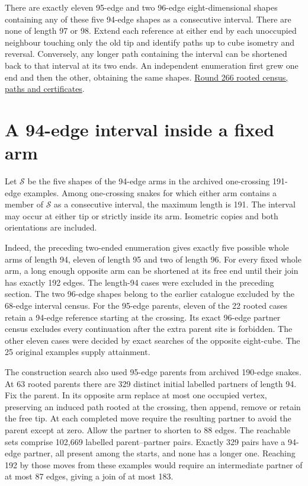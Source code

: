 \documentclass[11pt,a4paper]{article}
\theoremstyle{definition}
\theoremstyle{remark}
\begin{document}
There are exactly eleven 95-edge and two 96-edge eight-dimensional shapes
containing any of these five 94-edge shapes as a consecutive interval.
There are none of length 97 or 98. Extend each reference at either
end by each unoccupied neighbour touching only the old tip and identify
paths up to cube isometry and reversal. Conversely, any longer path
containing the interval can be shortened back to that interval at its
two ends. An independent enumeration first grew one end and then the
other, obtaining the same shapes.
\href{https://github.com/hironaka-iori/Snake-in-the-box-in-9/tree/main/milestones/266-rebuilding-one-arm}{Round 266 rooted census, paths and certificates}.

\section{A 94-edge interval inside a fixed arm}
Let $\mathcal S$ be the five shapes of the 94-edge arms in the archived
one-crossing 191-edge examples. Among one-crossing snakes for which either
arm contains a member of $\mathcal S$ as a consecutive interval, the
maximum length is 191. The interval may occur at either tip or strictly
inside its arm. Isometric copies and both orientations are included.

Indeed, the preceding two-ended enumeration gives exactly five possible
whole arms of length 94, eleven of length 95 and two of length 96.
For every fixed whole arm, a long enough opposite arm can be shortened at
its free end until their join has exactly 192 edges. The length-94 cases
were excluded in the preceding section. The two 96-edge shapes belong
to the earlier catalogue excluded by the 68-edge interval census.
For the 95-edge parents, eleven of the 22 rooted cases retain a 94-edge
reference starting at the crossing. Its exact 96-edge partner census
excludes every continuation after the extra parent site is forbidden.
The other eleven cases were decided by exact searches of the opposite
eight-cube. The 25 original examples supply attainment.

The construction search also used 95-edge parents from archived 190-edge
snakes. At 63 rooted parents there are 329 distinct initial labelled
partners of length 94. Fix the parent. In its opposite arm replace at
most one occupied vertex, preserving an induced path rooted at the
crossing, then append, remove or retain the free tip. At each completed
move require the resulting partner to avoid the parent except at zero.
Allow the partner to shorten to 88 edges. The reachable sets comprise
102,669 labelled parent--partner pairs. Exactly 329 pairs have a
94-edge partner, all present among the starts, and none has a longer one.
Reaching 192 by those moves from these examples would require an
intermediate partner of at most 87 edges, giving a join of at most 183.
\end{document}
